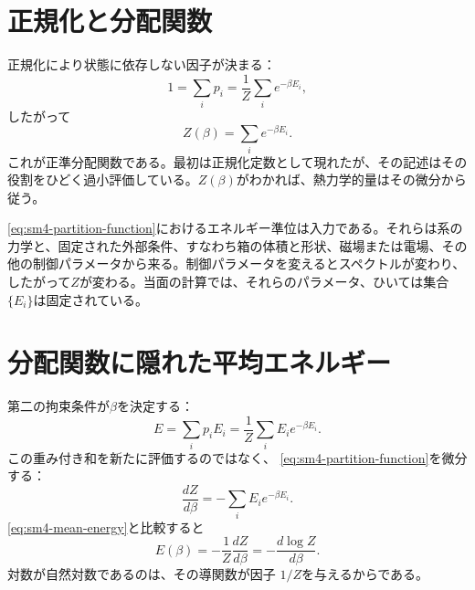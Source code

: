 \section{正規化と分配関数}

正規化により状態に依存しない因子が決まる：
\begin{equation}
 1=\sum_i p_i
 =\frac{1}{Z}\sum_i e^{-\beta E_i},
\end{equation}
したがって
\begin{equation}
 Z(\beta)=\sum_i e^{-\beta E_i}.
 \label{eq:sm4-partition-function}
\end{equation}
これが正準分配関数である。最初は正規化定数として現れたが、その記述はその役割をひどく過小評価している。\(Z(\beta)\)がわかれば、熱力学的量はその微分から従う。

\eqref{eq:sm4-partition-function}におけるエネルギー準位は入力である。それらは系の力学と、固定された外部条件、すなわち箱の体積と形状、磁場または電場、その他の制御パラメータから来る。制御パラメータを変えるとスペクトルが変わり、したがって\(Z\)が変わる。当面の計算では、それらのパラメータ、ひいては集合\(\{E_i\}\)は固定されている。

\begin{classroomqa}
\end{classroomqa}

\section{分配関数に隠れた平均エネルギー}

第二の拘束条件が\(\beta\)を決定する：
\begin{equation}
 E=\sum_i p_iE_i
 =\frac{1}{Z}\sum_i E_i e^{-\beta E_i}.
 \label{eq:sm4-mean-energy}
\end{equation}
この重み付き和を新たに評価するのではなく、
\eqref{eq:sm4-partition-function}を微分する：
\begin{equation}
 \frac{dZ}{d\beta}
 =-\sum_i E_i e^{-\beta E_i}.
\end{equation}
\eqref{eq:sm4-mean-energy}と比較すると
\begin{equation}
 E(\beta)
 =-\frac{1}{Z}\frac{dZ}{d\beta}
 =-\frac{d\log Z}{d\beta}.
 \label{eq:sm4-energy-logz}
\end{equation}
対数が自然対数であるのは、その導関数が因子
\(1/Z\)を与えるからである。

